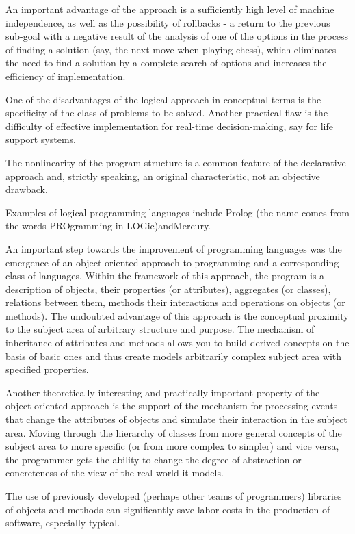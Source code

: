\documentclass[12pt]{book}
\begin{document}
An important advantage of the approach is a sufficiently high level of machine independence, as well as the possibility of rollbacks - a return to the previous sub-goal with a negative result of the analysis of one of the options in the process of finding a solution (say, the next move when playing chess), which eliminates the need to find a solution by a complete search of options and increases the efficiency of implementation.

One of the disadvantages of the logical approach in conceptual terms is the specificity of the class of problems to be solved. Another practical flaw is the difficulty of effective implementation for real-time decision-making, say for life support systems.

The nonlinearity of the program structure is a common feature of the declarative approach and, strictly speaking, an original characteristic, not an objective drawback.

Examples of logical programming languages include Prolog  (the name comes from the words  PROgramming  in  LOGic)andMercury.

An important step towards the improvement of programming languages was the emergence of an object-oriented approach to programming and a corresponding class of languages. Within the framework of this approach, the program is a description of objects, their properties (or attributes), aggregates (or classes), relations between them, methods their interactions and operations on objects (or methods). The undoubted advantage of this approach is the conceptual proximity to the subject area of arbitrary structure and purpose. The mechanism of inheritance of attributes and methods allows you to build derived concepts on the basis of basic ones and thus create models arbitrarily complex subject area with specified properties.

Another theoretically interesting and practically important property of the object-oriented approach is the support of the mechanism for processing events that change the attributes of objects and simulate their interaction in the subject area. Moving through the hierarchy of classes from more general concepts of the subject area to more specific (or from more complex to simpler) and vice versa, the programmer gets the ability to change the degree of abstraction or concreteness of the view of the real world it models.

The use of previously developed (perhaps other teams of programmers) libraries of objects and methods can significantly save labor costs in the production of software, especially typical.
\end{document}
